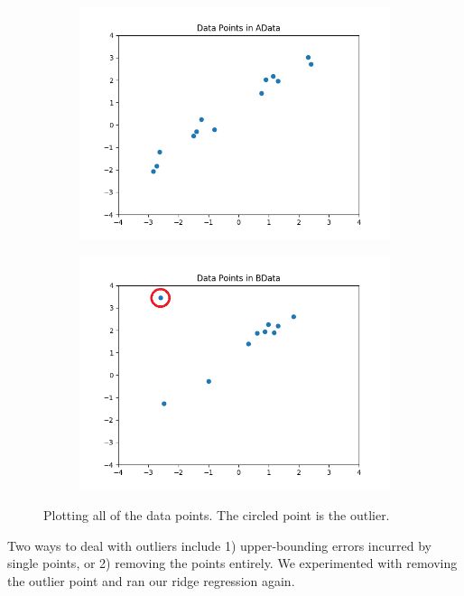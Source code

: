 \documentclass{article}
\begin{document}
\begin{figure}[H]
\centering
        \begin{subfigure}[b]{0.4\textwidth}
                \includegraphics[width=\linewidth]{../P3/figs/A_data.png}
        \end{subfigure}%
        \begin{subfigure}[b]{0.4\textwidth}
                \includegraphics[width=\linewidth]{../P3/figs/B_data.png}
        \end{subfigure}%
  \caption*{Plotting all of the data points. The circled point is the outlier.}
\end{figure}

Two ways to deal with outliers include 1) upper-bounding errors incurred by single points, or 2) removing the points entirely. We experimented with removing the outlier point and ran our ridge regression again.
\end{document}
